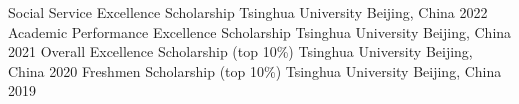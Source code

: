 


\begin{cvhonors}

  \cvhonor
    {Social Service Excellence Scholarship} %
    {Tsinghua University} %
    {Beijing, China} %
    {2022} %
  \cvhonor
    {Academic Performance Excellence Scholarship} %
    {Tsinghua University} %
    {Beijing, China} %
    {2021} %
  \cvhonor
    {Overall Excellence Scholarship (top 10\%)} %
    {Tsinghua University} %
    {Beijing, China} %
    {2020} %
  \cvhonor
    {Freshmen Scholarship (top 10\%)} %
    {Tsinghua University} %
    {Beijing, China} %
    {2019} %
\end{cvhonors}